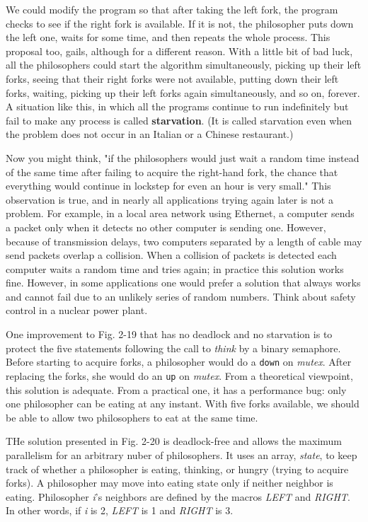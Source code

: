 \documentclass{book}
\newcommand {\kw}  [1] {\textbf{#1}}
\newcommand {\sys} [1] {\textsl{#1}}
\newcommand {\cmd} [1] {\texttt{#1}}
\begin{document}
We could modify the program so that after taking the left fork, the program checks to see if the right fork is available.
If it is not, the philosopher puts down the left one, waits for some time, and then repeats the whole process.
This proposal too, gails, although for a different reason.
With a little bit of bad luck, all the philosophers could start the algorithm simultaneously, 
picking up their left forks, seeing that their right forks were not available, putting down their left forks, waiting, 
picking up their left forks again simultaneously, and so on, forever.
A situation like this, in which all the programs continue to run indefinitely but fail to make any process is called \kw{starvation}.
(It is called starvation even when the problem does not occur in an Italian or a Chinese restaurant.)

Now you might think, "if the philosophers would just wait a random time instead of the same time after failing to acquire the right-hand fork,
the chance that everything would continue in lockstep for even an hour is very small."
This observation is true, and in nearly all applications trying again later is not a problem.
For example, in a local area network using Ethernet, a computer sends a packet only when it detects no other computer is sending one.
However, because of transmission delays, two computers separated by a length of cable may send packets overlap a collision. 
When a collision of packets is detected each computer waits a random time and tries again;
in practice this solution works fine.
However, in some applications one would prefer a solution that always works and cannot fail due to an unlikely series of random numbers.
Think about safety control in a nuclear power plant.

One improvement to Fig. 2-19 that has no deadlock and no starvation is to 
protect the five statements following the call to \sys{think} by a binary semaphore.
Before starting to acquire forks, a philosopher would do a \cmd{down} on \sys{mutex}.
After replacing the forks, she would do an \cmd{up} on \sys{mutex}.
From a theoretical viewpoint, this solution is adequate.
From a practical one, it has a performance bug: only one philosopher can be eating at any instant.
With five forks available, we should be able to allow two philosophers to eat at the same time.

THe solution presented in Fig. 2-20 is deadlock-free and allows the maximum parallelism for an arbitrary nuber of philosophers.
It uses an array, \sys{state}, to keep track of whether a philosopher is eating, thinking, or hungry (trying to acquire forks).
A philosopher may move into eating state only if neither neighbor is eating.
Philosopher \sys{i}'s neighbors are defined by the macros \sys{LEFT} and \sys{RIGHT}.
In other words, if \sys{i} is 2, \sys{LEFT} is 1 and \sys{RIGHT} is 3.
\end{document}
